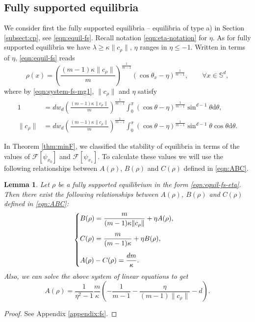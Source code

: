 \documentclass[11pt]{amsart}
\newtheorem{lemma}{Lemma}[section]
\newcommand{\bbs}{\mathbb S}
\def\d{\mathrm{d}}
\newcommand{\dm}{d} %
\begin{document}
\subsection{Fully supported equilibria}
\label{subsect:mg2:fs}
We consider first the fully supported equilibria -- equilibria of type a) in Section \ref{subsect:cp}, see \eqref{eqn:equil-fs}. Recall notation \eqref{eqn:eta-notation} for $\eta$. As for fully supported equilibria we have $\lambda \geq \kappa \|c_\rho\|$, $\eta$ ranges in $\eta \leq -1$. Written in terms of $\eta$, \eqref{eqn:equil-fs} reads
\begin{equation}
\label{eqn:equil-fs-eta}
\rho(x)=\left(\frac{(m-1)\kappa \|c_\rho\|}{m}\right)^{\frac{1}{m-1}}\left(\cos\theta_x-\eta\right)^{\frac{1}{m-1}},\qquad\forall x\in \bbs^\dm,
\end{equation}
where by \eqref{eqn:system-fs-mg1}, $\| c_\rho\|$ and $\eta$ satisfy
\begin{subequations}
\label{eqn:1s-comp}
\begin{align}
1&=\dm w_\dm\left(\frac{(m-1) \kappa \|c_\rho\|}{m}\right)^{\frac{1}{m-1}}\int_0^\pi (\cos\theta-\eta)^{\frac{1}{m-1}}\sin^{\dm-1}\theta\d\theta, \label{eqn:1-comp}\\
\|c_\rho\|&=\dm w_\dm\left(\frac{(m-1) \kappa \|c_\rho\|}{m}\right)^{\frac{1}{m-1}}\int_0^\pi (\cos\theta-\eta)^{\frac{1}{m-1}}\sin^{\dm-1}\theta\cos\theta\d\theta. \label{eqn:s-comp}
\end{align}
\end{subequations}

In Theorem \ref{thm:minF}, we classified the stability of equilibria in terms of the values of $\mathcal{F}[\psi_{x_0}]$ and $\mathcal{F}[\psi_{x_1}]$. To calculate these values we will use the following relationships between $A(\rho)$, $B(\rho)$ and $C(\rho)$ defined in \eqref{eqn:ABC}.
\begin{lemma}
\label{lemma:ABC-fs}
Let $\rho$ be a fully supported equilibrium in the form \eqref{eqn:equil-fs-eta}. Then there exist the following relationships between $A(\rho)$, $B(\rho)$ and $C(\rho)$ defined in \eqref{eqn:ABC}:
\begin{align}
\label{ABC-system-fs}
\begin{cases}
\displaystyle B(\rho) = \frac{m}{(m-1)\kappa \|c_\rho\|} + \eta A(\rho),\vspace{0.3cm}\\
\displaystyle C(\rho)=\frac{m}{(m-1)\kappa}+\eta B(\rho),\vspace{0.3cm}\\
\displaystyle A(\rho)-C(\rho)=\frac{\dm m}{\kappa}.
\end{cases}
\end{align}
Also, we can solve the above system of linear equations to get
\begin{equation}
\label{eqn:A-fs-calc2}
A(\rho)=\frac{1}{\eta^2-1}\frac{m}{\kappa}\left(-\frac{1}{m-1}-\frac{\eta}{(m-1)\|c_\rho\|}-\dm\right).
\end{equation}
\end{lemma}
\begin{proof}
See Appendix \ref{appendix:fs}.
\end{proof}
\end{document}
